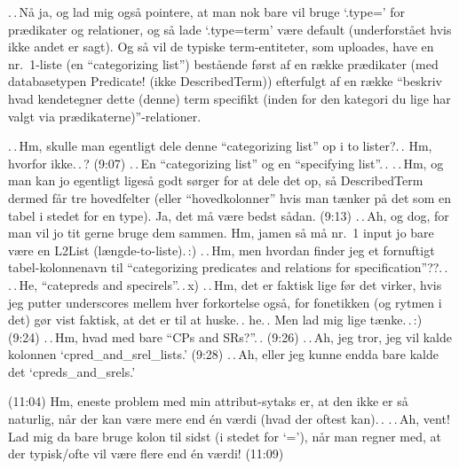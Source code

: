 \documentclass{report}
\begin{document}
.\,.\,Nå ja, og lad mig også pointere, at man nok bare vil bruge `.type=' for prædikater og relationer, og så lade `.type=term' være default (underforstået hvis ikke andet er sagt). Og så vil de typiske term-entiteter, som uploades, have en nr.\ 1-liste (en ``categorizing list'') bestående først af en række prædikater (med databasetypen Predicate! (ikke DescribedTerm)) efterfulgt af en række ``beskriv hvad kendetegner dette (denne) term specifikt (inden for den kategori du lige har valgt via prædikaterne)''-relationer. 

.\,.\,Hm, skulle man egentligt dele denne ``categorizing list'' op i to lister?.\,. Hm, hvorfor ikke.\,.\,? (9:07) .\,.\,En ``categorizing list'' og en ``specifying list''.\,. .\,.\,Hm, og man kan jo egentligt ligeså godt sørger for at dele det op, så DescribedTerm dermed får tre hovedfelter (eller ``hovedkolonner'' hvis man tænker på det som en tabel i stedet for en type). Ja, det må være bedst sådan. (9:13) .\,.\,Ah, og dog, for man vil jo tit gerne bruge dem sammen. Hm, jamen så må nr.\ 1 input jo bare være en L2List (længde-to-liste).\,:) .\,.\,Hm, men hvordan finder jeg et fornuftigt tabel-kolonnenavn til ``categorizing predicates and relations for specification''??.\,. .\,.\,He, ``catepreds and specirels''.\,.\,x) .\,.\,Hm, det er faktisk lige før det virker, hvis jeg putter underscores mellem hver forkortelse også, for fonetikken (og rytmen i det) gør vist faktisk, at det er til at huske.\,. he.\,. Men lad mig lige tænke.\,.\,:) (9:24) .\,.\,Hm, hvad med bare ``CPs and SRs?''.\,. (9:26) .\,.\,Ah, jeg tror, jeg vil kalde kolonnen `cpred\_and\_srel\_lists.' (9:28) .\,.\,Ah, eller jeg kunne endda bare kalde det `cpreds\_and\_srels.'

(11:04) Hm, eneste problem med min attribut-sytaks er, at den ikke er så naturlig, når der kan være mere end én værdi (hvad der oftest kan).\,. .\,.\,Ah, vent! Lad mig da bare bruge kolon til sidst (i stedet for `='), når man regner med, at der typisk/ofte vil være flere end én værdi! (11:09)
\end{document}
